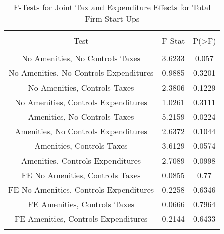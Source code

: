 
\begin{table}[!htbp] \centering 
  \caption{F-Tests for Joint Tax and Expenditure Effects for Total Firm Start Ups} 
  \label{--Ftests} 
\begin{tabular}{@{\extracolsep{5pt}} ccc} 
\\[-1.8ex]\hline 
\hline \\[-1.8ex] 
Test & F-Stat & P(\textgreater F) \\ 
\hline \\[-1.8ex] 
No Amenities, No Controls Taxes & 3.6233 & 0.057 \\ 
No Amenities, No Controls Expenditures & 0.9885 & 0.3201 \\ 
No Amenities, Controls Taxes & 2.3806 & 0.1229 \\ 
No Amenities, Controls Expenditures & 1.0261 & 0.3111 \\ 
Amenities, No Controls Taxes & 5.2159 & 0.0224 \\ 
Amenities, No Controls Expenditures & 2.6372 & 0.1044 \\ 
Amenities, Controls Taxes & 3.6129 & 0.0574 \\ 
Amenities, Controls Expenditures & 2.7089 & 0.0998 \\ 
FE No Amenities, Controls Taxes & 0.0855 & 0.77 \\ 
FE No Amenities, Controls Expenditures & 0.2258 & 0.6346 \\ 
FE Amenities, Controls Taxes & 0.0666 & 0.7964 \\ 
FE Amenities, Controls Expenditures & 0.2144 & 0.6433 \\ 
\hline \\[-1.8ex] 
\end{tabular} 
\end{table} 
